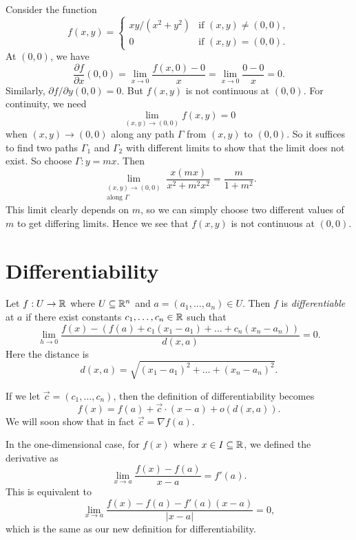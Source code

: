 \begin{example}
  Consider the function
  \[
    f(x, y) =
    \begin{cases}
      xy / (x^2 + y^2) & \text{if } (x, y) \neq (0, 0), \\
      0 & \text{if } (x, y) = (0, 0).
    \end{cases}
  \]
  At $(0, 0)$, we have
  \[
    \frac{\partial f}{\partial x}(0, 0)
    = \lim_{x \to 0} \frac{f(x, 0) - 0}{x} = \lim_{x \to 0} \frac{0 - 0}{x} = 0.
  \]
  Similarly, $\partial f / \partial y (0, 0) = 0$.
  But $f(x, y)$ is not continuous at $(0, 0)$. For
  continuity, we need
  \[
    \lim_{(x, y) \to (0, 0)} f(x, y) = 0
  \]
  when $(x, y) \to (0, 0)$ along any path $\Gamma$
  from $(x, y)$ to $(0, 0)$. So it suffices to find two
  paths $\Gamma_1$ and $\Gamma_2$ with different limits
  to show that the limit does not exist. So choose
  $\Gamma : y = mx$. Then
  \[
    \lim_{\substack{(x, y) \to (0, 0) \\ \text{along } \Gamma}} \frac{x(mx)}{x^2 + m^2 x^2} = \frac{m}{1 + m^2}.
  \]
  This limit clearly depends on $m$, so we can
  simply choose
  two different values of $m$ to get differing limits.
  Hence we see that $f(x, y)$ is not continuous at
  $(0, 0)$.
\end{example}

\section{Differentiability}
\begin{definition}
  Let $f : U \to \mathbb{R}$ where $U \subseteq \mathbb{R}^n$ and
  $a = (a_1, \dots, a_n) \in U$. Then $f$ is
  \emph{differentiable} at $a$ if there exist
  constants $c_1, \dots, c_n \in \mathbb{R}$ such that
  \[
    \lim_{h \to 0} \frac{f(x) - (f(a) + c_1(x_1 - a_1) + \dots + c_n(x_n - a_n))}{d(x, a)} = 0.
  \]
  Here the distance is
  \[
    d(x, a) = \sqrt{(x_1 - a_1)^2 + \dots + (x_n - a_n)^2}.
  \]
\end{definition}

\begin{remark}
  If we let $\vec{c} = (c_1, \dots, c_n)$, then the
  definition of differentiability becomes
  \[
    f(x) = f(a) + \vec{c} \cdot (x - a) + o(d(x, a)).
  \]
  We will soon show that in fact $\vec{c} = \nabla f(a)$.
\end{remark}

\begin{remark}
  In the one-dimensional case, for $f(x)$ where
  $x \in I \subseteq \mathbb{R}$, we defined the derivative
  as
  \[
    \lim_{x \to a} \frac{f(x) - f(a)}{x - a} = f'(a).
  \]
  This is equivalent to
  \[
    \lim_{x \to a} \frac{f(x) - f(a) - f'(a)(x - a)}{|x - a|} = 0,
  \]
  which is the same as
  our new definition for differentiability.
\end{remark}

